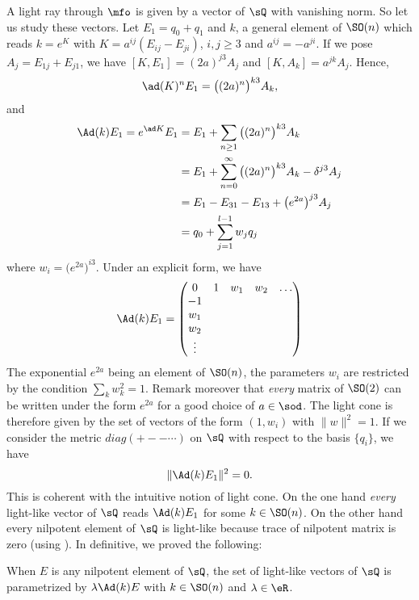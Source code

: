 A light ray through $\mfo$ is given by a vector of $\sQ$ with vanishing norm. So let us study these vectors. Let $E_1=q_0+q_1$ and $k$, a general element of  $\SO(n)$ which reads $k= e^{K}$ with $K=a^{ij}(E_{ij}-E_{ji})$, $i,j\geq 3$ and $a^{ij}=-a^{ji}$.  If we pose $A_j=E_{1j}+E_{j1}$, we have $[K,E_1]=(2a)^{j3}A_j$ and $[K,A_k]=a^{jk}A_j$. Hence,
\[
	\ad(K)^nE_1=\big((2a)^n\big)^{k3}A_k,
\]
and
\begin{equation} \label{eq:Adkeu}
	\begin{split}
		\Ad(k)E_1=e^{\ad K}E_1 & =E_1+\sum_{n\geq 1}\big( (2a)^n\big)^{k3}A_k                       \\
		                       & =E_1+\sum_{n=0}^{\infty}\big(  (2a)^n \big)^{k3}A_k-\delta^{j3}A_j \\
		                       & =E_1-E_{31}-E_{13}+\big( e^{2a}\big)^{j3}A_j                       \\
		                       & =q_0+\sum_{j=1}^{l-1}w_jq_j
	\end{split}
\end{equation}
where $w_i=\big(  e^{2a} \big)^{i3}$. Under an explicit form, we have
\begin{equation} \label{eq:AdkE}
	\Ad(k)E_1=
	\begin{pmatrix}
		0 & 1 & w_1 & w_2 & \ldots \\
		-1                         \\
		w_1                        \\
		w_2                        \\
		\vdots
	\end{pmatrix}
\end{equation}
The exponential $ e^{2a}$ being an element of $\SO(n)$, the parameters $w_i$ are restricted by the condition $\sum_{k}w_k^2=1$.  Remark moreover that \emph{every} matrix of $\SO(2)$ can be written under the form $e^{2a}$ for a good choice of $a\in\sod$. The light cone is therefore given by the set of vectors of the form $(1,w_i)$ with $\|w\|^2=1$. If we consider the metric $diag(+--\cdots)$ on $\sQ$ with respect to the basis $\{q_i\}$, we have
\[
	\|\Ad(k)E_1\|^2=0.
\]
This is coherent with the intuitive notion of light cone. On the one hand \emph{every} light-like vector of $\sQ$ reads $\Ad(k)E_1$ for some $k\in\SO(n)$. On the other hand every nilpotent element of $\sQ$ is light-like because trace of nilpotent matrix is zero (using ). In definitive, we proved the following:

\begin{proposition}		\label{PropNormZeroEQnil}
	When $E$ is any nilpotent element of $\sQ$, the set of light-like vectors of $\sQ$ is parametrized by $\lambda\Ad(k)E$ with $k\in\SO(n)$ and $\lambda\in\eR$.
	\label{PropToutVectLumQ}
\end{proposition}

